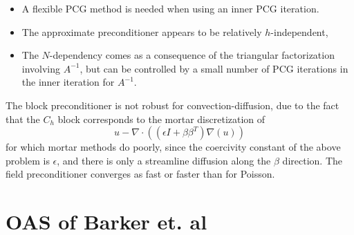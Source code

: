 \documentclass{article}
\newcommand{\grad}{\nabla}
\renewcommand{\div}{\grad \cdot}
\begin{document}
\begin{itemize}
\item A flexible PCG method is needed when using an inner PCG iteration.
\item The approximate preconditioner appears to be relatively $h$-independent, 
\item The $N$-dependency comes as a consequence of the triangular factorization involving $A^{-1}$, but can be controlled by a small number of PCG iterations in the inner iteration for $A^{-1}$.  
\end{itemize}
The block preconditioner is not robust for convection-diffusion, due to the fact that the $C_h$ block corresponds to the mortar discretization of 
\[
u - \div((\epsilon I + \beta\beta^T)\grad(u))
\]
for which mortar methods do poorly, since the coercivity constant of the above problem is $\epsilon$, and there is only a streamline diffusion along the $\beta$ direction.  The field preconditioner converges as fast or faster than for Poisson.  
\begin{figure}
\centering
{}
\end{figure}

\section{OAS of Barker et. al}
\end{document}
